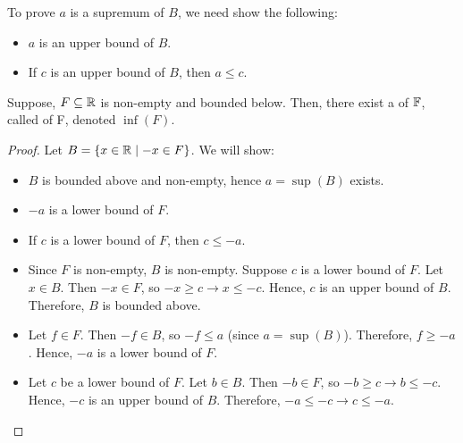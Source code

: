 \documentclass[11pt]{article}
\begin{document}
\begin{remark}
    To prove \(a\) is a supremum of \(B\), we need show the following:
    \begin{itemize}
        \item \(a\) is an upper bound of \(B\).
        \item If \(c\) is an upper bound of \(B\), then \(a \leqslant c\).
    \end{itemize}
\end{remark}

\begin{theorem}
    Suppose, \(F \subseteq \mathbb R\) is non-empty and bounded below. Then, there exist a  of \(\mathbb F\), called  of F, denoted \(\inf(F)\).
\end{theorem}
\begin{proof}
    Let \(B = \{x \in \mathbb R \mid -x \in F\}\). We will show:
    \begin{itemize}
        \item \(B\) is bounded above and non-empty, hence \(a = \sup(B)\) exists.
        \item \(-a\) is a lower bound of \(F\).
        \item If \(c\) is a lower bound of \(F\), then \(c \leqslant -a\).
    \end{itemize}
    \begin{itemize}
        \item Since \(F\) is non-empty, \(B\) is non-empty. Suppose \(c\) is a lower bound
              of \(F\). Let \(x \in B\). Then \(-x \in F\), so \(-x \geqslant
              c \rightarrow x \leqslant -c\). Hence, \(c\) is an upper bound of \(B\).
              Therefore, \(B\) is bounded above.
        \item Let \(f \in F\). Then \(-f \in B\), so \(-f \leq a\) (since \(a = \sup(B)\)).
              Therefore, \(f \geq -a\). Hence, \(-a\) is a lower bound of \(F\). 
        \item Let \(c\) be a lower bound of \(F\). Let \(b \in B\). Then \(-b \in F\), so \(-b \geq c \rightarrow b \leq -c\). Hence, \(-c\) is an upper bound of \(B\). Therefore, \(-a \leq -c \rightarrow c \leq -a\). 
    \end{itemize}
\end{proof}
\end{document}
